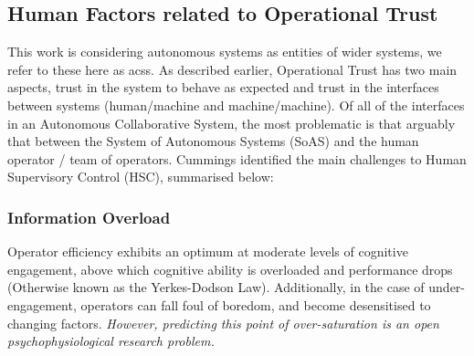 
\subsection{Human Factors related to Operational Trust}

This work is considering autonomous systems as entities of wider systems, we refer to these here as \glspl{acs}.
As described earlier, Operational Trust has two main aspects, trust in the system to behave as expected and trust in the interfaces between systems (human/machine and machine/machine).
Of all of the interfaces in an Autonomous Collaborative System, the most problematic is that arguably that between the System of Autonomous Systems (SoAS) and the human operator / team of operators.
Cummings identified the main challenges to Human Supervisory Control (HSC), summarised below:\cite{Cummings2010}

\subsubsection{Information Overload}
Operator efficiency exhibits an optimum at moderate levels of cognitive engagement, above which cognitive ability is overloaded and performance drops (Otherwise known as the Yerkes-Dodson Law).
Additionally, in the case of under-engagement, operators can fall foul of boredom, and become desensitised to changing factors.
\textit{However, predicting this point of over-saturation is an open psychophysiological research problem.}

